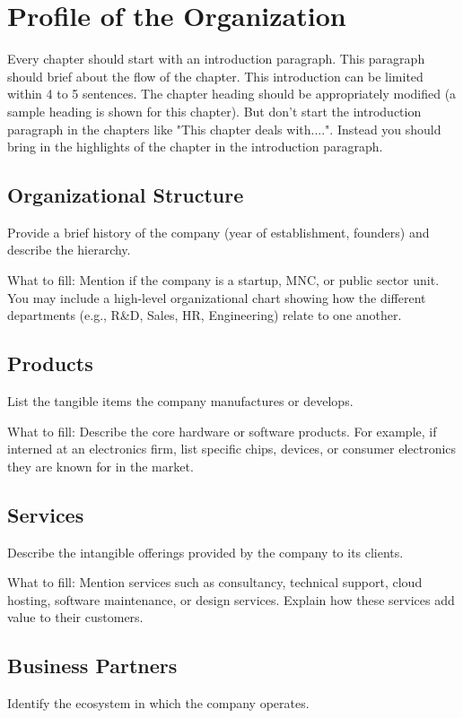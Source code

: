 \chapter{Profile of the Organization}
Every chapter should start with an introduction paragraph. This paragraph should brief about the flow of the chapter. This introduction can be limited within 4 to 5 sentences. The chapter heading should be appropriately modified (a sample heading is shown for this chapter). But don't start the introduction paragraph in the chapters like "This chapter deals with....". Instead you should bring in the highlights of the chapter in the introduction paragraph.

\section{Organizational Structure}
Provide a brief history of the company (year of establishment, founders) and describe the hierarchy.

What to fill: Mention if the company is a startup, MNC, or public sector unit. You may include a high-level organizational chart showing how the different departments (e.g., R\&D, Sales, HR, Engineering) relate to one another.

\section{Products}
List the tangible items the company manufactures or develops.

What to fill: Describe the core hardware or software products. For example, if interned at an electronics firm, list specific chips, devices, or consumer electronics they are known for in the market.

\section{Services}
Describe the intangible offerings provided by the company to its clients.

What to fill: Mention services such as consultancy, technical support, cloud hosting, software maintenance, or design services. Explain how these services add value to their customers.

\section{Business Partners}
Identify the ecosystem in which the company operates.

